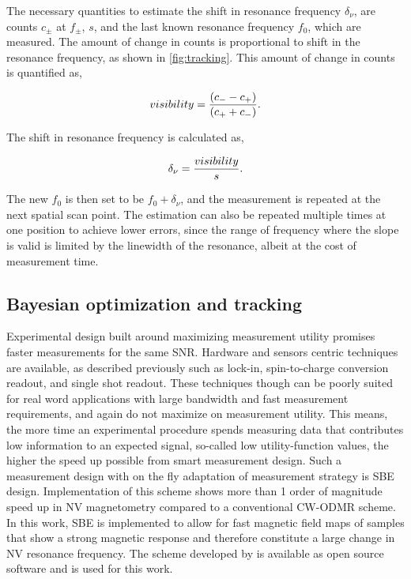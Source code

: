 The necessary quantities to estimate the shift in resonance frequency $\delta_{\nu}$, are counts $c_{\pm}$ at $f_{\pm}$, $s$, and the last known resonance frequency $f_0$, which are measured. The amount of change in counts is proportional to shift in the resonance frequency, as shown in \cref{fig:tracking}. This amount of change in counts is quantified as,

\begin{equation}
    \centering
    visibility = \frac{(c_- - c_+)}{(c_+ + c_-)}.
\end{equation}

The shift in resonance frequency is calculated as,

\begin{equation}
    \centering
    \delta_{\nu} = \frac{visibility}{s}.
\end{equation}

The new $f_0$ is then set to be $f_0 + \delta_{\nu}$, and the measurement is repeated at the next spatial scan point. The estimation can also be repeated multiple times at one position to achieve lower errors, since the range of frequency where the slope is valid is limited by the linewidth of the resonance, albeit at the cost of measurement time.

\subsection{Bayesian optimization and tracking}
Experimental design built around maximizing measurement utility promises faster measurements for the same \gls{SNR}. Hardware and sensors centric techniques are available, as described previously such as lock-in\cite{schoenfeldRealTimeMagnetic2011}, spin-to-charge conversion readout\cite{shieldsEfficientReadoutSingle2015}, and single shot readout\cite{neumannSingleShotReadoutSingle2010}. These techniques though can be poorly suited for real word applications with large bandwidth and fast measurement requirements, and again do not maximize on measurement utility. This means, the more time an experimental procedure spends measuring data that contributes low information to an expected signal, so-called low utility-function values, the higher the speed up possible from smart measurement design. Such a measurement design with on the fly adaptation of measurement strategy is \gls{SBE} design\cite{dushenkoSequentialBayesianExperiment2020}. Implementation of this scheme shows more than 1 order of magnitude speed up in \gls{NV} magnetometry compared to a conventional \gls{CW}-\gls{ODMR} scheme. In this work, \gls{SBE} is implemented to allow for fast magnetic field maps of samples that show a strong magnetic response and therefore constitute a large change in \gls{NV} resonance frequency. The scheme developed by \citeauthor*{dushenkoSequentialBayesianExperiment2020} is available as open source software and is used for this work.

